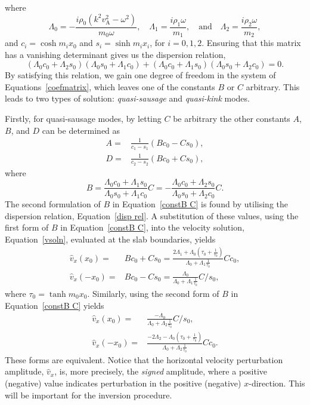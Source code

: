 \documentclass[12pt]{../style-files/ociamthesis}
\begin{document}
where
\begin{equation}
\Lambda_0 = -\frac{i\rho_0(k^2v_\textrm{A}^2 - \omega^2)}{m_0\omega}, \quad \Lambda_1 = \frac{i\rho_1\omega}{m_1}, \quad \text{and} \quad \Lambda_2 = \frac{i\rho_2\omega}{m_2}, \label{Lambdas}
\end{equation}
and $c_i = \cosh{m_ix_0}$ and $s_i = \sinh{m_ix_i}$, for $i = 0, 1, 2$. Ensuring that this matrix has a vanishing determinant gives us the dispersion relation,
\begin{equation}
(\Lambda_0c_0 + \Lambda_2s_0)(\Lambda_0s_0 + \Lambda_1c_0) + (\Lambda_0c_0 + \Lambda_1s_0)(\Lambda_0s_0 + \Lambda_2c_0) = 0. \label{disp rel}
\end{equation}
By satisfying this relation, we gain one degree of freedom in the system of Equations~\eqref{coefmatrix}, which leaves one of the constants $B$ or $C$ arbitrary. This leads to two types of solution: \textit{quasi-sausage} and \textit{quasi-kink} modes.

Firstly, for quasi-sausage modes, by letting $C$ be arbitrary the other constants $A$, $B$, and $D$ can be determined as
\begin{align}
A =& \frac{1}{c_1 - s_1}(Bc_0 - Cs_0), \label{constA C} \\ 
D =& \frac{1}{c_2 - s_2}(Bc_0 + Cs_0), \label{constD C}
\end{align}
where
\begin{equation}
B = \frac{\Lambda_0c_0 + \Lambda_1s_0}{\Lambda_0s_0 + \Lambda_1c_0}C = -\frac{\Lambda_0c_0 + \Lambda_2s_0}{\Lambda_0s_0 + \Lambda_2c_0}C. \label{constB C}
\end{equation}
The second formulation of $B$ in Equation~\eqref{constB C} is found by utilising the dispersion relation, Equation~\eqref{disp rel}. A substitution of these values, using the first form of $B$ in Equation~\eqref{constB C}, into the velocity solution, Equation~\eqref{vsoln}, evaluated at the slab boundaries, yields
\begin{align}
\hat{v}_x(x_0) =& Bc_0 + Cs_0 = \frac{2\Lambda_1 + \Lambda_0\left(\tau_0 + \frac{1}{\tau_0}\right)}{\Lambda_0 + \Lambda_1\frac{1}{\tau_0}}Cc_0, \label{vx_01 C} \\
\hat{v}_x(-x_0) =& Bc_0 - Cs_0 = \frac{\Lambda_0}{\Lambda_0 + \Lambda_1\frac{1}{\tau_0}}C/s_0, \label{v-x_01 C}
\end{align}
where $\tau_0 = \tanh{m_0x_0}$. Similarly, using the second form of $B$ in Equation~\eqref{constB C} yields
\begin{align}
\hat{v}_x(x_0) =& \frac{-\Lambda_0}{\Lambda_0 + \Lambda_2\frac{1}{\tau_0}}C/s_0, \label{vx_02 C} \\
\hat{v}_x(-x_0) =& \frac{-2\Lambda_2 - \Lambda_0\left(\tau_0 + \frac{1}{\tau_0}\right)}{\Lambda_0 + \Lambda_2\frac{1}{\tau_0}}Cc_0. \label{v-x_02 C}
\end{align}
These forms are equivalent. Notice that the horizontal velocity perturbation amplitude, $\hat{v}_x$, is, more precisely, the \emph{signed} amplitude, where a positive (negative) value indicates perturbation in the positive (negative) $x$-direction. This will be important for the inversion procedure.
\end{document}
